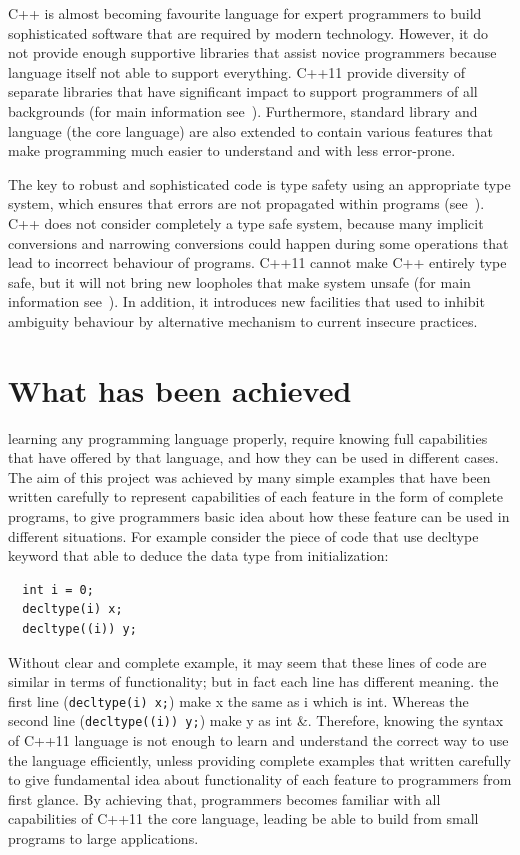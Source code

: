 \documentclass[11pt]{report}
\begin{document}
C++ is almost becoming favourite language for expert programmers to build sophisticated software that are required by modern technology. However, it do not provide enough supportive libraries that assist novice programmers because language itself not able to support everything. C++11 provide diversity of separate libraries that have significant impact to support programmers of all backgrounds (for main information see~\cite{Stroustrup:2005:Design}). Furthermore, standard library and language (the core language) are also extended to contain various features that make programming much easier to understand and with less error-prone.

The key to robust and sophisticated code is type safety using an appropriate type system, which ensures that errors are not propagated within programs (see~\cite{Stroustrup:2005:Cpp}). C++ does not consider completely a type safe system, because many implicit conversions and narrowing conversions could happen during some operations that lead to incorrect behaviour of programs. C++11 cannot make C++ entirely type safe, but it will not bring new loopholes that make system unsafe (for main information see~\cite{Stroustrup:2005:Cpp}). In addition, it introduces new facilities that used to inhibit ambiguity behaviour by alternative mechanism to current insecure practices.


\section{What has been achieved}
\label{what has been achieved}
learning any programming language properly, require knowing full capabilities that have offered by that language, and how they can be used in different cases. The aim of this project was achieved by many simple examples that have been written carefully to represent capabilities of each feature in the form of complete programs, to give programmers basic idea about how these feature can be used in different situations. For example consider the piece of code that use decltype keyword that able to deduce the data type from initialization:
\begin{lstlisting}
  int i = 0;
  decltype(i) x;
  decltype((i)) y;
\end{lstlisting}
Without clear and complete example, it may seem that these lines of code are similar in terms of functionality; but in fact each line has different meaning. the first line (\texttt{decltype(i) x;}) make x the same as i which is int. Whereas the second line (\texttt{decltype((i)) y;}) make y as int \&. Therefore, knowing the syntax of C++11 language is not enough to learn and understand the correct way to use the language efficiently, unless providing complete examples that written carefully to give fundamental idea about functionality of each feature to programmers from first glance. By achieving that, programmers becomes familiar with all capabilities of C++11 the core language, leading be able to build from small programs to large applications.
\end{document}
